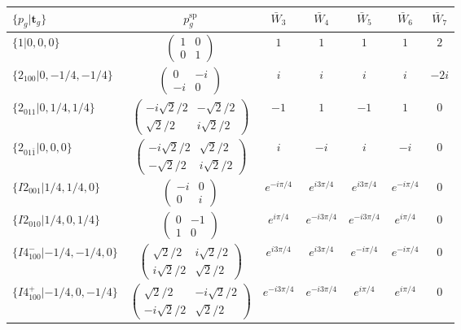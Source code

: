 \documentclass[3p,preprint]{elsarticle}
\newcommand{\bt}{\bm{t}}
\begin{document}
\begin{table}[H]
	\begin{tabular}{|l|c||c|c|c|c|c|} \hline
		$\{p_g|\bt_g\}$ & $p_g^{\text{sp}}$ & $\bar{W}_3$ & $\bar{W}_4$ & $\bar{W}_5$ & $\bar{W}_6$ & $\bar{W}_{7}$  \\ \hline \hline
		$\{1|0,0,0\}$ & 				$\left(\begin{array}{cc} 1&0 \\ 0&1 \end{array}\right)$ &$1$ &  $1$ &  $1$ &  $1$ &  $2$ \\ \hline
		$\{2_{100}|0,-1/4,-1/4\}$ &		$\left(\begin{array}{cc} 0&-i \\ -i&0 \end{array}\right)$	& $i$ & $i$ & $i$ & $i$ & $-2i$ \\ \hline
		$\{2_{011}|0,1/4,1/4\}$ &		$\left(\begin{array}{cc} -i\sqrt{2}/2&-\sqrt{2}/2 \\ \sqrt{2}/2&i\sqrt{2}/2 \end{array}\right)$	&$-1$ & $1$ & $-1$ & $1$ & $0$ \\ \hline
		$\{2_{01\bar{1}}|0,0,0\}$ &		$\left(\begin{array}{cc} -i\sqrt{2}/2&\sqrt{2}/2 \\ -\sqrt{2}/2&i\sqrt{2}/2 \end{array}\right)$	&$i$ & $-i$ & $i$ & $-i$ & $0$ \\ \hline
		$\{I2_{001}|1/4,1/4,0\}$ &		$\left(\begin{array}{cc} -i&0 \\ 0&i \end{array}\right)$	&$e^{-i\pi/4}$ & $e^{i 3\pi/4}$ & $e^{i 3\pi/4}$ & $e^{-i\pi/4}$ & 0 \\ \hline
		$\{I2_{010}|1/4,0,1/4\}$ &		$\left(\begin{array}{cc} 0&-1 \\ 1&0 \end{array}\right)$	&$e^{i\pi/4}$ & $e^{-i 3\pi/4}$ & $e^{-i 3\pi/4}$ & $e^{i\pi/4}$ & 0 \\ \hline
		$\{I4^{-}_{100}|-1/4,-1/4,0\}$ &		$\left(\begin{array}{cc} \sqrt{2}/2&i\sqrt{2}/2 \\ i\sqrt{2}/2&\sqrt{2}/2 \end{array}\right)$	&$e^{i3\pi/4}$ & $e^{i 3\pi/4}$ & $e^{-i \pi/4}$ & $e^{-i\pi/4}$ & 0 \\ \hline
		$\{I4^{+}_{100}|-1/4,0,-1/4\}$ &		$\left(\begin{array}{cc} \sqrt{2}/2&-i\sqrt{2}/2 \\ -i\sqrt{2}/2&\sqrt{2}/2 \end{array}\right)$	&$e^{-i3\pi/4}$ & $e^{-i 3\pi/4}$ & $e^{i \pi/4}$ & $e^{i\pi/4}$ & 0 \\ \hline
	\end{tabular}
\end{table}
\end{document}
